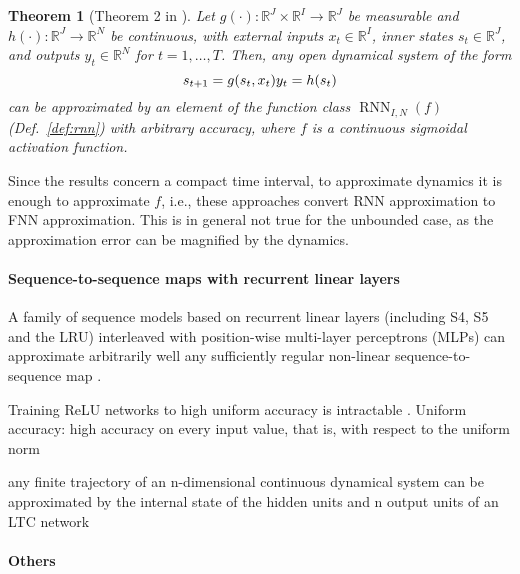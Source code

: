 \documentclass{article}
\newtheorem{theorem}{Theorem}
\theoremstyle{definition}
\theoremstyle{remark}
\begin{document}
\begin{theorem}[Theorem 2 in \citep{schafer2006recurrent}]
Let \( g(\cdot): \mathbb{R}^J \times \mathbb{R}^I \to \mathbb{R}^J \) be measurable and \( h(\cdot): \mathbb{R}^J \to \mathbb{R}^N \) be continuous, with external inputs \( x_t \in \mathbb{R}^I \), inner states \( s_t \in \mathbb{R}^J \), and outputs \( y_t \in \mathbb{R}^N \) for \( t = 1, \dots, T \). Then, any open dynamical system of the form
\[
s_{t+1} = g(s_t, x_t) \\
y_t = h(s_t)
\]
can be approximated by an element of the function class \(\operatorname{RNN}_{I,N}(f)\) (Def.~\ref{def:rnn}) with arbitrary accuracy, where \( f \) is a continuous sigmoidal activation function. %
\end{theorem}

Since the results concern a compact time interval, to approximate dynamics it is enough to approximate $f$, i.e., these approaches convert RNN approximation to FNN approximation.
This is in general not true for the unbounded case, as the approximation error can be magnified by the dynamics.



\paragraph{Sequence-to-sequence maps with recurrent linear layers}
A family of sequence models based on recurrent linear layers (including S4, S5 and the LRU) interleaved with position-wise multi-layer perceptrons (MLPs) can approximate arbitrarily well any sufficiently regular non-linear sequence-to-sequence map \citep{orvieto2023a}.

Training ReLU networks to high uniform accuracy is intractable \citep{berner2022}.
Uniform accuracy: high accuracy on every input value, that is, with respect to the uniform norm 

any finite trajectory of an n-dimensional continuous dynamical system can be approximated by the internal state of the hidden units and n output units of an LTC network \citep{hasani2018liquid}

\paragraph{Others}
\citep{jin1995universal}
\citep{kimura1998learning}
\citep{kambhampati2000approximation}
\citep{hwang2022minimal}
\citep{hasani2022closed}
\end{document}
